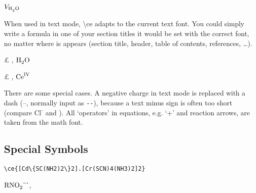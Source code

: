 \documentclass[a4paper,notitlepage]{scrreprt}
\newcommand\macro[1]{{\ttfamily\textbackslash#1}}
\newcommand\fromversion[1]{\marginpar{{\scriptsize version$\geq$#1}}}
\begin{document}
\medskip

\begin{SideBySideExample}[xrightmargin=5cm]
  $V_{\ce{H2O}}$
\end{SideBySideExample}

\medskip

\noindent
When used in text mode, \macro{ce} adapts to the current text font. You could simply write a formula in one of your section titles it would be set with the correct font, no matter where is appears (section title, header, table of contents, references, \dots).

\medskip

\begin{SideBySideExample}[xrightmargin=5cm]
  £\sffamily 
  , $\ce{H2O}$
\end{SideBySideExample}

\medskip

\begin{SideBySideExample}[xrightmargin=5cm]
  £\sffamily 
  , $\ce{Ce^{IV}}$
\end{SideBySideExample}
\fromversion{2.04}

\medskip

\noindent
There are some special cases. A negative charge in text mode is replaced with a dash (--, normally input as \verb|--|), because a text minus sign is  often too short (compare $\text{Cl}^{\text{-}}$ and ). All `operators' in equations, e.g. `+' and reaction arrows, are  taken from the math font.


\subsection{Special Symbols}

\begin{SideBySideExample}[xrightmargin=5cm]
\end{SideBySideExample}

\medskip
\begin{SideBySideExample}[xrightmargin=5cm]
\end{SideBySideExample}

\medskip
\noindent{}\par
\noindent\hspace{5cm}\verb|\ce{[Cd\{SC(NH2)2\}2].[Cr(SCN)4(NH3)2]2}|

\medskip
\begin{SideBySideExample}[xrightmargin=5cm]
  $\ce{RNO2^{-.}}$, 
\end{SideBySideExample}
\fromversion{2}
\end{document}
